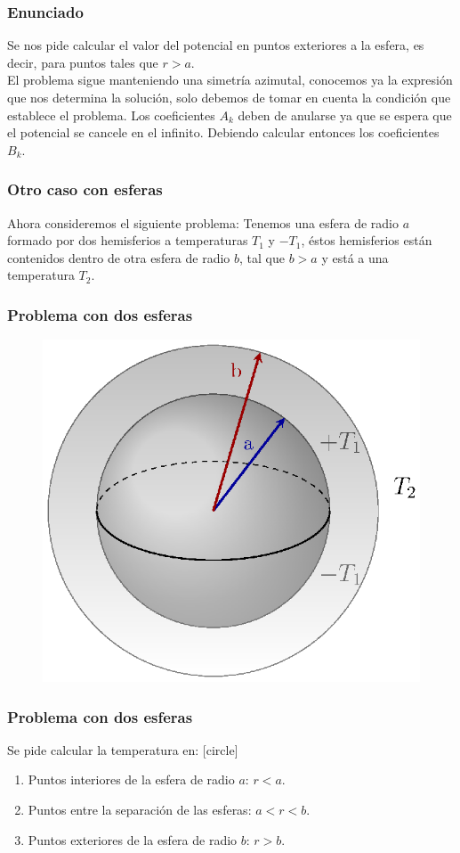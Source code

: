 \documentclass[12pt]{beamer}
\begin{document}
\begin{frame}
\frametitle{Enunciado}
Se nos pide calcular el valor del potencial en puntos exteriores a la esfera, es decir, para puntos tales que $r > a$.
\\
\bigskip
\pause
El problema sigue manteniendo una simetría azimutal, conocemos ya la expresión que nos determina la solución, solo debemos de tomar en cuenta la condición que establece el problema. \pause Los coeficientes $A_{k}$ deben de anularse ya que se espera que el potencial se cancele en el infinito. \pause Debiendo calcular entonces los coeficientes $B_{k}$.
\end{frame}
\begin{frame}
\frametitle{Otro caso con esferas}
Ahora consideremos el siguiente problema: Tenemos una esfera de radio $a$ formado por dos hemisferios a temperaturas $T_{1}$ y $-T_{1}$, éstos hemisferios están contenidos dentro de otra esfera de radio $b$, tal que $b > a$ y está a una temperatura $T_{2}$.
\end{frame}
\begin{frame}
\frametitle{Problema con dos esferas}
\begin{figure}
    \centering
    \includegraphics[scale=0.8]{Imagenes/Ejemplo_Esfera_02.eps}
\end{figure}
\end{frame}
\begin{frame}
\frametitle{Problema con dos esferas}
Se pide calcular la temperatura en:
[circle]
\begin{enumerate}[<+->]
\item Puntos interiores de la esfera de radio $a$: $r < a$.
\item Puntos entre la separación de las esferas: $a < r < b$.
\item Puntos exteriores de la esfera de radio $b$: $r > b$.
\end{enumerate}
\end{frame}
\end{document}
